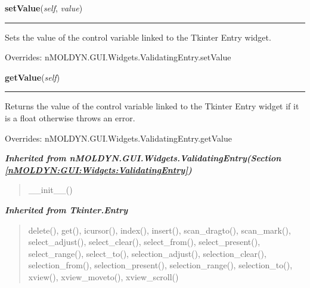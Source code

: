     \vspace{0.5ex}

\hspace{.8\funcindent}\begin{boxedminipage}{\funcwidth}

    \raggedright \textbf{setValue}(\textit{self}, \textit{value})

    \vspace{-1.5ex}

    \rule{\textwidth}{0.5\fboxrule}
\setlength{\parskip}{2ex}
    Sets the value of the control variable linked to the Tkinter Entry 
    widget.

\setlength{\parskip}{1ex}
      Overrides: nMOLDYN.GUI.Widgets.ValidatingEntry.setValue

    \end{boxedminipage}

    \vspace{0.5ex}

\hspace{.8\funcindent}\begin{boxedminipage}{\funcwidth}

    \raggedright \textbf{getValue}(\textit{self})

    \vspace{-1.5ex}

    \rule{\textwidth}{0.5\fboxrule}
\setlength{\parskip}{2ex}
    Returns the value of the control variable linked to the Tkinter Entry 
    widget if it is a float otherwise throws an error.

\setlength{\parskip}{1ex}
      Overrides: nMOLDYN.GUI.Widgets.ValidatingEntry.getValue

    \end{boxedminipage}


\large{\textbf{\textit{Inherited from nMOLDYN.GUI.Widgets.ValidatingEntry\textit{(Section \ref{nMOLDYN:GUI:Widgets:ValidatingEntry})}}}}

\begin{quote}
\_\_init\_\_()
\end{quote}

\large{\textbf{\textit{Inherited from Tkinter.Entry}}}

\begin{quote}
delete(), get(), icursor(), index(), insert(), scan\_dragto(), scan\_mark(), select\_adjust(), select\_clear(), select\_from(), select\_present(), select\_range(), select\_to(), selection\_adjust(), selection\_clear(), selection\_from(), selection\_present(), selection\_range(), selection\_to(), xview(), xview\_moveto(), xview\_scroll()
\end{quote}

